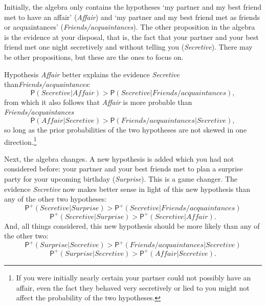 \documentclass[
  11pt,
  dvipsnames,enabledeprecatedfontcommands]{scrartcl}
\newcommand{\pr}[1]{\ensuremath{\mathsf{P}(#1)}}
\newcommand{\ppr}[2]{\ensuremath{\mathsf{P}^{#1}(#2)}}
\begin{document}
\noindent Initially, the algebra only contains the hypotheses `my
partner and my best friend met to have an affair' (\textit{Affair}) and
`my partner and my best friend met as friends or acquaintances'
(\textit{Friends/acquaintances}). The other proposition in the algebra
is the evidence at your disposal, that is, the fact that your partner
and your best friend met one night secretively and without telling you
(\textit{Secretive}). There may be other propositions, but these are the
ones to focus on.

Hypothesis \textit{Affair} better explains the evidence
\textit{Secretive} than\textit{Friends/acquaintances}:
\[\pr{ \textit{Secretive} \vert \textit{Affair}}> \pr{\textit{Secretive} \vert \textit{Friends/acquaintances}},\]
from which it also follows that \textit{Affair} is more probable than
\textit{Friends/acquaintances}
\[\pr{\textit{Affair} \vert  \textit{Secretive} }> \pr{\textit{Friends/acquaintances} \vert \textit{Secretive}}, \tag{>}\]
so long as the prior probabilities of the two hypotheses are not skewed
in one direction.\footnote{If you were initially nearly certain your
  partner could not possibly have an affair, even the fact they behaved
  very secretively or lied to you might not affect the probability of
  the two hypotheses.}

Next, the algebra changes. A new hypothesis is added which you had not
considered before: your partner and your best friends met to plan a
surprise party for your upcoming birthday (\textit{Surprise}). This is a
game changer. The evidence \textit{Secretive} now makes better sense in
light of this new hypothesis than any of the other two hypotheses:
\[\ppr{+}{ \textit{Secretive} \vert \textit{Surprise}}> \ppr{+}{\textit{Secretive} \vert \textit{Friends/acquaintances}}\]
\[\ppr{+}{ \textit{Secretive} \vert \textit{Surprise}}> \ppr{+}{\textit{Secretive} \vert \textit{Affair}}.\]
And, all things considered, this new hypothesis should be more likely
than any of the other two:
\[\ppr{+}{ \textit{Surprise} \vert \textit{Secretive}}> \ppr{+}{ \textit{Friends/acquaintances} \vert \textit{Secretive} }\]
\[\ppr{+}{ \textit{Surprise} \vert \textit{Secretive}}> \ppr{+}{ \textit{Affair} \vert \textit{Secretive}}. \tag{*}\]
\end{document}
